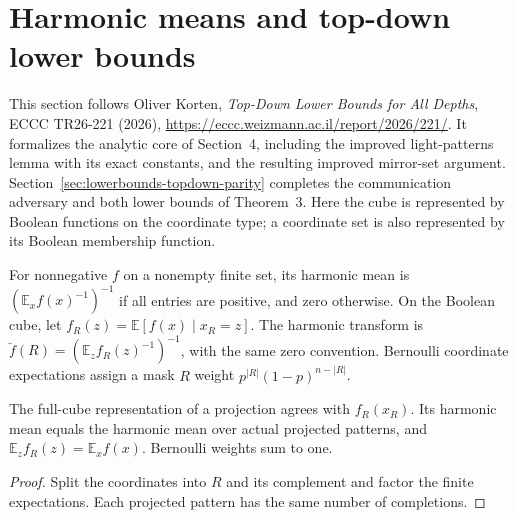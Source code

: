 \section{Harmonic means and top-down lower bounds}
\label{sec:analysis-harmonic}

This section follows Oliver Korten, \emph{Top-Down Lower Bounds for All
Depths}, ECCC TR26-221 (2026),
\url{https://eccc.weizmann.ac.il/report/2026/221/}. It formalizes the analytic
core of Section~4, including the improved light-patterns lemma with its exact
constants, and the resulting improved mirror-set argument.
Section~\ref{sec:lowerbounds-topdown-parity} completes the communication
adversary and both lower bounds of Theorem~3.
Here the cube is represented by Boolean functions on the coordinate type;
a coordinate set is also represented by its Boolean membership function.

\begin{definition}
  \label{def:analysis-harmonic}
  \leanok
  For nonnegative $f$ on a nonempty finite set, its harmonic mean is
  $(\mathbb{E}_x f(x)^{-1})^{-1}$ if all entries are positive, and zero
  otherwise. On the Boolean cube, let
  $f_R(z)=\mathbb{E}[f(x)\mid x_R=z]$. The harmonic transform is
  $\breve f(R)=(\mathbb{E}_z f_R(z)^{-1})^{-1}$, with the same zero convention.
  Bernoulli coordinate expectations assign a mask $R$ weight
  $p^{|R|}(1-p)^{n-|R|}$.
\end{definition}

\begin{theorem}
  \label{thm:analysis-harmonic-marginal}
  \leanok
  The full-cube representation of a projection agrees with $f_R(x_R)$.
  Its harmonic mean equals the harmonic mean over actual projected patterns,
  and $\mathbb{E}_z f_R(z)=\mathbb{E}_x f(x)$. Bernoulli weights sum to one.
\end{theorem}
\begin{proof}
  \leanok
  Split the coordinates into $R$ and its complement and factor the finite
  expectations. Each projected pattern has the same number of completions.
\end{proof}

